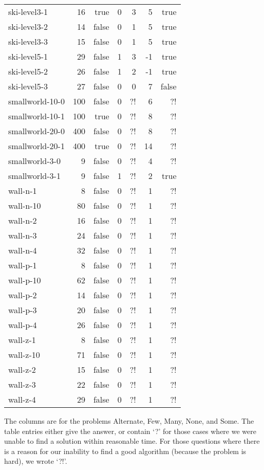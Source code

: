 \documentclass{tufte-handout}
\begin{document}
\begin{longtable}{lrrrrrr}
	ski-level3-1 & 16 & true & 0 & 3 & 5 & true\\
	ski-level3-2 & 14 & false & 0 & 1 & 5 & true\\
	ski-level3-3 & 15 & false & 0 & 1 & 5 & true\\
	ski-level5-1 & 29 & false & 1 & 3 & -1 & true\\
	ski-level5-2 & 26 & false & 1 & 2 & -1 & true\\
	ski-level5-3 & 27 & false & 0 & 0 & 7 & false\\
	smallworld-10-0 & 100 & false & 0 & ?! & 6 & ?!\\
	smallworld-10-1 & 100 & true & 0 & ?! & 8 & ?!\\
	smallworld-20-0 & 400 & false & 0 & ?! & 8 & ?!\\
	smallworld-20-1 & 400 & true & 0 & ?! & 14 & ?!\\
	smallworld-3-0 & 9 & false & 0 & ?! & 4 & ?!\\
	smallworld-3-1 & 9 & false & 1 & ?! & 2 & true\\
	wall-n-1 & 8 & false & 0 & ?! & 1 & ?!\\
	wall-n-10 & 80 & false & 0 & ?! & 1 & ?!\\
	wall-n-2 & 16 & false & 0 & ?! & 1 & ?!\\
	wall-n-3 & 24 & false & 0 & ?! & 1 & ?!\\
	wall-n-4 & 32 & false & 0 & ?! & 1 & ?!\\
	wall-p-1 & 8 & false & 0 & ?! & 1 & ?!\\
	wall-p-10 & 62 & false & 0 & ?! & 1 & ?!\\
	wall-p-2 & 14 & false & 0 & ?! & 1 & ?!\\
	wall-p-3 & 20 & false & 0 & ?! & 1 & ?!\\
	wall-p-4 & 26 & false & 0 & ?! & 1 & ?!\\
	wall-z-1 & 8 & false & 0 & ?! & 1 & ?!\\
	wall-z-10 & 71 & false & 0 & ?! & 1 & ?!\\
	wall-z-2 & 15 & false & 0 & ?! & 1 & ?!\\
	wall-z-3 & 22 & false & 0 & ?! & 1 & ?!\\
	wall-z-4 & 29 & false & 0 & ?! & 1 & ?!\\

	\bottomrule
\end{longtable}
\medskip

The columns are for the problems Alternate, Few, Many, None, and Some.
The table entries either give the answer, or contain `?' for those cases where we were unable to find a solution within reasonable time.
For those questions where there is a reason for our inability to find a good algorithm (because the problem is hard), we wrote `?!'.
\end{document}
